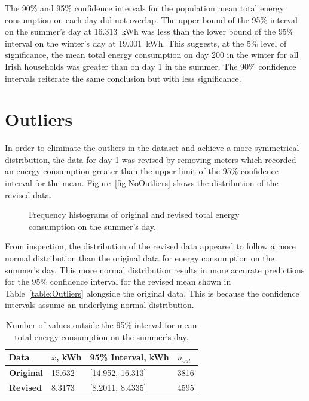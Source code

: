 \documentclass[a4paper,10pt,twocolumn]{article}
\begin{document}
The 90\% and 95\% confidence intervals for the population mean total energy 
consumption on each day did not overlap. The upper bound of the 95\% interval 
on the summer's day at 16.313~kWh was less than the lower bound of the 95\% 
interval on the winter's day at 19.001~kWh. This suggests, at the 5\% level of 
significance, the mean total energy consumption on day 200 in the winter for 
all Irish households was greater than on day 1 in the summer. The 90\% 
confidence intervals reiterate the same conclusion but with less significance.

\section{Outliers}

In order to eliminate the outliers in the dataset and achieve a more 
symmetrical distribution, the data for day 1 was revised by removing meters 
which recorded an energy consumption greater than the upper limit of the 95\% 
confidence interval for the mean. Figure~\vref{fig:NoOutliers} shows the 
distribution of the revised data.

\begin{figure}[h]
    \centering
    \def\svgwidth{0.5\textwidth}
    
    \caption{Frequency histograms of original and revised total energy 
    consumption on the summer's day.}
    \label{fig:NoOutliers}
\end{figure}

From inspection, the distribution of the revised data appeared to follow a more 
normal distribution than the original data for energy consumption on the 
summer's day. This more normal distribution results in more accurate 
predictions for the 95\% confidence interval for the revised mean shown in 
Table~\vref{table:Outliers} alongside the original data. This is because the 
confidence intervals assume an underlying normal distribution.

\begin{table}[h]
    \centering
    \caption{Number of values outside the 95\% interval for mean total energy 
        consumption on the summer's day.\vspace{-\parsep}}
    \begin{tabular}{llll}
        \toprule
        \textbf{Data} & $\bar{x}$, \tiny{kWh} & 95\% Interval, \tiny{kWh} & 
        $n_{out}$ \\
        \midrule
        \textbf{Original} & 15.632 & [14.952, 16.313] & 3816 \\
        \textbf{Revised}  & 8.3173 & [8.2011, 8.4335] & 4595 \\
        \bottomrule
    \end{tabular}
    \label{table:Outliers}
\end{table}
\end{document}
